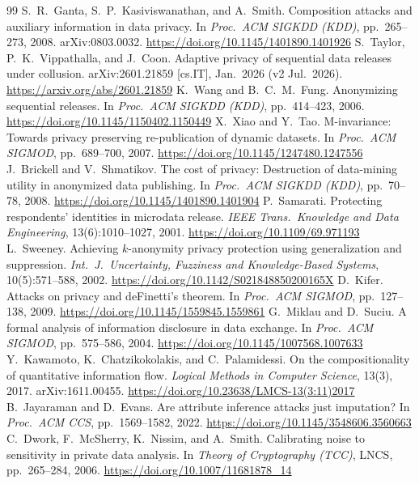 \documentclass[11pt]{article}
\begin{document}
\begin{thebibliography}{99}\small
\setlength{\itemsep}{0pt}
 S.~R.~Ganta, S.~P.~Kasiviswanathan, and A.~Smith. Composition attacks and auxiliary information in data privacy. In \emph{Proc.\ ACM SIGKDD (KDD)}, pp.~265--273, 2008. arXiv:0803.0032. \url{https://doi.org/10.1145/1401890.1401926}
 S.~Taylor, P.~K.~Vippathalla, and J.~Coon. Adaptive privacy of sequential data releases under collusion. arXiv:2601.21859 [cs.IT], Jan.\ 2026 (v2 Jul.\ 2026). \url{https://arxiv.org/abs/2601.21859}
 K.~Wang and B.~C.~M.~Fung. Anonymizing sequential releases. In \emph{Proc.\ ACM SIGKDD (KDD)}, pp.~414--423, 2006. \url{https://doi.org/10.1145/1150402.1150449}
 X.~Xiao and Y.~Tao. M-invariance: Towards privacy preserving re-publication of dynamic datasets. In \emph{Proc.\ ACM SIGMOD}, pp.~689--700, 2007. \url{https://doi.org/10.1145/1247480.1247556}
 J.~Brickell and V.~Shmatikov. The cost of privacy: Destruction of data-mining utility in anonymized data publishing. In \emph{Proc.\ ACM SIGKDD (KDD)}, pp.~70--78, 2008. \url{https://doi.org/10.1145/1401890.1401904}
 P.~Samarati. Protecting respondents' identities in microdata release. \emph{IEEE Trans.\ Knowledge and Data Engineering}, 13(6):1010--1027, 2001. \url{https://doi.org/10.1109/69.971193}
 L.~Sweeney. Achieving $k$-anonymity privacy protection using generalization and suppression. \emph{Int.\ J.\ Uncertainty, Fuzziness and Knowledge-Based Systems}, 10(5):571--588, 2002. \url{https://doi.org/10.1142/S021848850200165X}
 D.~Kifer. Attacks on privacy and deFinetti's theorem. In \emph{Proc.\ ACM SIGMOD}, pp.~127--138, 2009. \url{https://doi.org/10.1145/1559845.1559861}
 G.~Miklau and D.~Suciu. A formal analysis of information disclosure in data exchange. In \emph{Proc.\ ACM SIGMOD}, pp.~575--586, 2004. \url{https://doi.org/10.1145/1007568.1007633}
 Y.~Kawamoto, K.~Chatzikokolakis, and C.~Palamidessi. On the compositionality of quantitative information flow. \emph{Logical Methods in Computer Science}, 13(3), 2017. arXiv:1611.00455. \url{https://doi.org/10.23638/LMCS-13(3:11)2017}
 B.~Jayaraman and D.~Evans. Are attribute inference attacks just imputation? In \emph{Proc.\ ACM CCS}, pp.~1569--1582, 2022. \url{https://doi.org/10.1145/3548606.3560663}
 C.~Dwork, F.~McSherry, K.~Nissim, and A.~Smith. Calibrating noise to sensitivity in private data analysis. In \emph{Theory of Cryptography (TCC)}, LNCS, pp.~265--284, 2006. \url{https://doi.org/10.1007/11681878_14}

\end{thebibliography}
\end{document}
